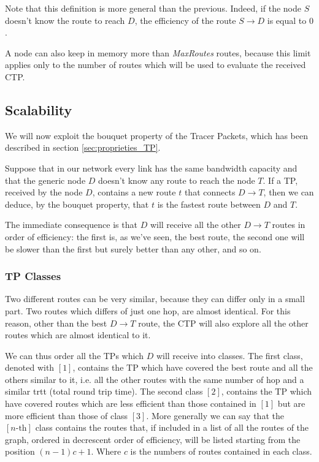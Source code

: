\documentclass[a4paper]{article}
\begin{document}
Note that this definition is more general than the previous. Indeed, if the
node $S$ doesn't know the route to reach $D$, the efficiency of the route $S
\rightarrow D$ is equal to $0$.

A node can also keep in memory more than \emph{MaxRoutes} routes, because this
limit applies only to the number of routes which will be used to evaluate the
received CTP.

\subsection{Scalability}
\label{sec:Scalability}
We will now exploit the bouquet property of the Tracer Packets, which has
been described in section \ref{sec:proprieties_TP}.

Suppose that in our network every link has the same bandwidth capacity and
that the generic node $D$ doesn't know any route to reach the
node $T$.
If a TP, received by the node $D$, contains a new route $t$ that
connects $D \rightarrow T$, then we can deduce, by the bouquet property, that
$t$ is the fastest route between $D$ and $T$.

The immediate consequence is that $D$ will receive all the other $D
\rightarrow T$ routes in order of efficiency: the first is, as we've seen,
the best route, the second one will be slower than the first but surely
better than any other, and so on.


\subsubsection{TP Classes}
\label{sec:tp_classes}
Two different routes can be very similar, because they can differ only in a
small part. Two routes which differs of just one hop, are almost identical.
For this reason, other than the best $D \rightarrow  T$ route, the CTP will
also explore all the other routes which are almost identical to it.

We can thus order all the TPs which $D$ will receive into classes. The first
class, denoted with $[1]$, contains the TP which have covered the best
route and all the others similar to it, i.e. all the other routes with the same
number of hop and a similar trtt (total round trip time).
The second class $[2]$, contains the TP which have covered routes which are
less efficient than those contained in $[1]$ but are more efficient than those
of class $[3]$.
More generally we can say that the $[n\textrm{-th}]$ class contains the routes that,
if included in a list of all the routes of the graph, ordered in decrescent
order of efficiency, will be listed starting from the position $(n-1)c+1$. Where
$c$ is the numbers of routes contained in each class.
\end{document}
